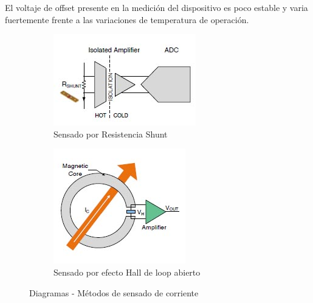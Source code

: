 \documentclass[10pt,a4paper]{article}
\begin{document}
	El voltaje de offset presente en la medición del dispositivo es poco estable y varia fuertemente frente a las variaciones de temperatura de operación.
	
	\begin{figure}[h!]
		\centering
		\begin{subfigure}[b]{0.4\linewidth}
			\includegraphics[width=\linewidth]{../assets/R-Shunt_Isolated_Sensor.jpg}
			\caption{Sensado por Resistencia Shunt}
		\end{subfigure}%
        \hspace{15mm}
		\begin{subfigure}[b]{0.4\linewidth}
			\includegraphics[width=\linewidth]{../assets/Open-loop_Hall_Sensor.jpg}
			\caption{Sensado por efecto Hall de loop abierto}
		\end{subfigure}
		\caption{Diagramas - Métodos de sensado de corriente}
		\label{fig:SenseMetods}
	\end{figure}
	
\end{document}
